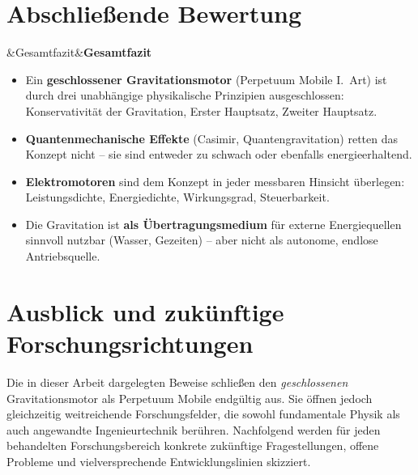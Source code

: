 ﻿\documentclass[12pt, a4paper]{report}
\newenvironment{wichtig}[1][]{%
  \begin{wichtigframe}\sloppy%
  \ifx&#1&\else\textbf{#1}\par\smallskip\fi}{\end{wichtigframe}}
\theoremstyle{definition}
\theoremstyle{remark}
\begin{document}
\section{Abschließende Bewertung}

\begin{wichtig}[Gesamtfazit]
  \begin{itemize}
    \item Ein \textbf{geschlossener Gravitationsmotor} (Perpetuum Mobile I.\ Art)
          ist durch drei unabhängige physikalische Prinzipien ausgeschlossen:
          Konservativität der Gravitation, Erster Hauptsatz, Zweiter Hauptsatz.
    \item \textbf{Quantenmechanische Effekte} (Casimir, Quantengravitation)
          retten das Konzept nicht -- sie sind entweder zu schwach oder ebenfalls energieerhaltend.
    \item \textbf{Elektromotoren} sind dem Konzept in jeder messbaren Hinsicht
          überlegen: Leistungsdichte, Energiedichte, Wirkungsgrad, Steuerbarkeit.
    \item Die Gravitation ist \textbf{als Übertragungsmedium} für externe
          Energiequellen sinnvoll nutzbar (Wasser, Gezeiten) -- aber nicht als
          autonome, endlose Antriebsquelle.
  \end{itemize}
\end{wichtig}

\section{Ausblick und zukünftige Forschungsrichtungen}
\label{sec:ausblick}

Die in dieser Arbeit dargelegten Beweise schließen den \emph{geschlossenen}
Gravitationsmotor als Perpetuum Mobile endgültig aus. Sie öffnen jedoch
gleichzeitig weitreichende Forschungsfelder, die sowohl fundamentale Physik als
auch angewandte Ingenieurtechnik berühren. Nachfolgend werden für jeden
behandelten Forschungsbereich konkrete zukünftige Fragestellungen, offene
Probleme und vielversprechende Entwicklungslinien skizziert.
\end{document}

